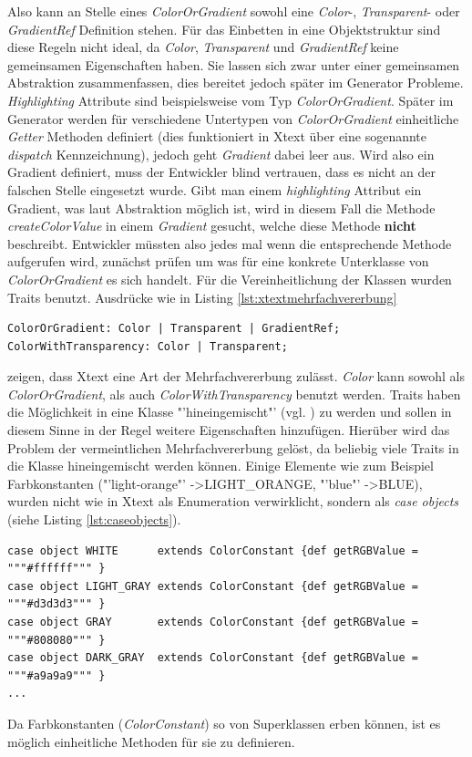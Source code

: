 Also kann an Stelle eines \textit{ColorOrGradient} sowohl eine \textit{Color}-, \textit{Transparent}- oder \textit{GradientRef} Definition stehen. Für das Einbetten in eine Objektstruktur sind diese Regeln nicht ideal, da \textit{Color}, \textit{Transparent} und \textit{GradientRef} keine gemeinsamen Eigenschaften haben. Sie lassen sich zwar unter einer gemeinsamen Abstraktion zusammenfassen, dies bereitet jedoch später im Generator Probleme. \textit{Highlighting} Attribute sind beispielsweise vom Typ \textit{ColorOrGradient}. Später im Generator werden für verschiedene Untertypen von \textit{ColorOrGradient} einheitliche \textit{Getter} Methoden definiert (dies funktioniert in Xtext über eine sogenannte \textit{dispatch} Kennzeichnung), jedoch geht \textit{Gradient} dabei leer aus. Wird also ein Gradient definiert, muss der Entwickler blind vertrauen, dass es nicht an der falschen Stelle eingesetzt wurde. Gibt man einem \textit{highlighting} Attribut ein Gradient, was laut Abstraktion möglich ist, wird in diesem Fall die Methode \textit{createColorValue} in einem \textit{Gradient} gesucht, welche diese Methode \textbf{nicht} beschreibt. Entwickler müssten also jedes mal wenn die entsprechende Methode aufgerufen wird, zunächst prüfen um was für eine konkrete Unterklasse von \textit{ColorOrGradient} es sich handelt.
Für die Vereinheitlichung der Klassen wurden Traits benutzt. Ausdrücke wie in Listing \ref{lst:xtextmehrfachvererbung}
\begin{lstlisting}[style=spray, caption = {Auszug aus der Style.xtext Grammatik, Color kann als ColorOrGradient oder als ColorWithTransparency benutzt werden}, label = {lst:xtextmehrfachvererbung}]
ColorOrGradient: Color | Transparent | GradientRef;
ColorWithTransparency: Color | Transparent;
\end{lstlisting}zeigen, dass Xtext eine Art der Mehrfachvererbung zulässt. \textit{Color} kann sowohl als \textit{ColorOrGradient}, als auch \textit{ColorWithTransparency} benutzt werden.
Traits haben die Möglichkeit in eine Klasse "'hineingemischt"' (vgl. ) zu werden und sollen in diesem Sinne in der Regel weitere Eigenschaften hinzufügen. Hierüber wird das Problem der vermeintlichen Mehrfachvererbung gelöst, da beliebig viele Traits in die Klasse hineingemischt werden können.
Einige Elemente wie zum Beispiel Farbkonstanten ("'light-orange"' -\textgreater LIGHT\_ORANGE, "'blue"' -\textgreater BLUE), wurden nicht wie in Xtext als Enumeration verwirklicht, sondern als \textit{case objects} (siehe Listing \ref{lst:caseobjects}).
\begin{lstlisting}[style=scala, caption = {ColorConstants als case objects}, label = {lst:caseobjects}]
case object WHITE      extends ColorConstant {def getRGBValue = """#ffffff""" }
case object LIGHT_GRAY extends ColorConstant {def getRGBValue = """#d3d3d3""" }
case object GRAY       extends ColorConstant {def getRGBValue = """#808080""" }
case object DARK_GRAY  extends ColorConstant {def getRGBValue = """#a9a9a9""" }
...
\end{lstlisting}Da Farbkonstanten (\textit{ColorConstant}) so von Superklassen erben können, ist es möglich einheitliche Methoden für sie zu definieren.
